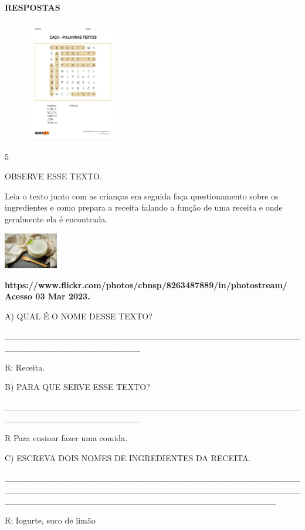 {{{{\textbf{RESPOSTAS}

\includegraphics[width=2.42537in,height=2.09849in]{media/image105.jpeg}

\num{5}

OBSERVE ESSE TEXTO.

Leia o texto junto com as crianças em seguida faça questionamento sobre
os ingredientes e como prepara a receita falando a função de uma receita
e onde geralmente ela é encontrada.

\includegraphics[width=0.92986in,height=0.61875in]{media/image106.jpeg}

\textbf{https://www.flickr.com/photos/cbnsp/8263487889/in/photostream/
Acesso 03 Mar 2023.}

A) QUAL É O NOME DESSE TEXTO?

\_\_\_\_\_\_\_\_\_\_\_\_\_\_\_\_\_\_\_\_\_\_\_\_\_\_\_\_\_\_\_\_\_\_\_\_\_\_\_\_\_\_\_\_\_\_\_\_\_\_\_\_\_\_\_\_\_\_\_\_\_\_\_\_\_\_\_\_\_\_

R: Receita.

B) PARA QUE SERVE ESSE TEXTO?

\_\_\_\_\_\_\_\_\_\_\_\_\_\_\_\_\_\_\_\_\_\_\_\_\_\_\_\_\_\_\_\_\_\_\_\_\_\_\_\_\_\_\_\_\_\_\_\_\_\_\_\_\_\_\_\_\_\_\_\_\_\_\_\_\_\_\_\_\_\_

R Para ensinar fazer uma comida.

C) ESCREVA DOIS NOMES DE INGREDIENTES DA RECEITA.

\_\_\_\_\_\_\_\_\_\_\_\_\_\_\_\_\_\_\_\_\_\_\_\_\_\_\_\_\_\_\_\_\_\_\_\_\_\_\_\_\_\_\_\_\_\_\_\_\_\_\_\_\_\_\_\_\_\_\_\_\_\_\_\_\_\_\_\_\_\_\_\_\_\_\_\_\_\_\_\_\_\_\_\_\_\_\_\_\_\_\_\_\_\_\_\_\_\_\_\_\_\_\_\_\_\_\_\_\_\_\_\_\_\_\_\_\_\_\_\_\_\_\_\_\_\_\_\_\_\_\_\_\_\_\_\_\_\_\_\_

R; Iogurte, suco de limão

}}}}
